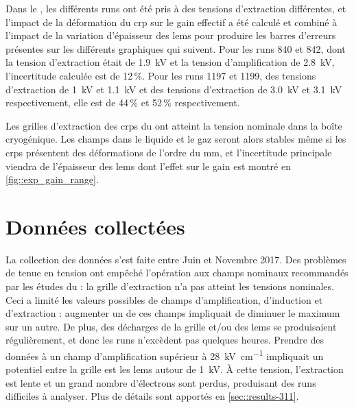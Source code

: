       Dans le \TOO{}, les différents runs ont été pris à des tensions d'extraction différentes, et l'impact de la déformation du \gls{crp} sur le gain effectif a été calculé et combiné à l'impact de la variation d'épaisseur des \glspl{lem} pour produire les barres d'erreurs présentes sur les différents graphiques qui suivent. Pour les runs 840 et 842, dont la tension d'extraction était de \SI{1.9}{\kilo\volt} et la tension d'amplification de \SI{2.8}{\kilo\volt}, l'incertitude calculée est de 12\,\%. Pour les runs 1197 et 1199, des tensions d'extraction de \SI{1}{\kilo\volt} et \SI{1.1}{\kilo\volt} et des tensions d'extraction de \SI{3.0}{\kilo\volt} et \SI{3.1}{\kilo\volt} respectivement, elle est de 44\,\% et 52\,\% respectivement.

      Les grilles d'extraction des \glspl{crp} du \SSS{} ont atteint la tension nominale dans la boîte cryogénique. Les champs dans le liquide et le gaz seront alors stables même si les \glspl{crp} présentent des déformations de l'ordre du \si{\milli\meter}, et l'incertitude principale viendra de l'épaisseur des \glspl{lem} dont l'effet sur le gain est montré en \autoref{fig::exp_gain_range}.
    
        
  \section{Données collectées}\label{sec::data-311}

    La collection des données s'est faite entre Juin et Novembre 2017. Des problèmes de tenue en tension ont empêché l'opération aux champs nominaux recommandés par les études du \threeL{} : la grille d'extraction n'a pas atteint les tensions nominales. Ceci a limité les valeurs possibles de champs d'amplification, d'induction et d'extraction : augmenter un de ces champs impliquait de diminuer le maximum sur un autre. De plus, des décharges de la grille et/ou des \glspl{lem} se produisaient régulièrement, et donc les runs n'excèdent pas quelques heures. Prendre des données à un champ d'amplification supérieur à \SI{28}{\kilo\volt\per\centi\meter} impliquait un potentiel entre la grille est les \glspl{lem} autour de \SI{1}{\kilo\volt}. À cette tension, l'extraction est lente et un grand nombre d'électrons sont perdus, produisant des runs difficiles à analyser. Plus de détails sont apportés en \autoref{sec::results-311}.
 
